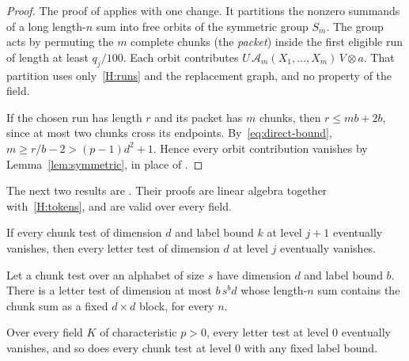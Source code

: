 \begin{proof}
The proof of \cite[Lemma~3.3]{OAI247periodic} applies with one change. It partitions the nonzero summands of a long
length-$n$ sum into free orbits of the symmetric group $S_m$. The group acts by permuting the $m$ complete chunks (the
\emph{packet}) inside the first eligible run of length at least $q_j/100$. Each orbit contributes
$U\,\mathcal A_m(X_1,\dots,X_m)\,V\otimes a$. That partition uses only~\ref{H:runs} and the replacement graph, and no
property of the field.

If the chosen run has length $r$ and its packet has $m$ chunks, then $r\leq mb+2b$, since at most two chunks cross its
endpoints. By~\eqref{eq:direct-bound}, $m\geq r/b-2>(p-1)d^2+1$. Hence every orbit contribution vanishes by
Lemma~\ref{lem:symmetric}, in place of \cite[Lemma~3.2]{OAI247periodic}.
\end{proof}

The next two results are \cite[Lemmas~3.4 and~3.5]{OAI247periodic}. Their proofs are linear algebra together
with~\ref{H:tokens}, and are valid over every field.

\begin{lemma}\label{lem:cut}
If every chunk test of dimension $d$ and label bound $k$ at level $j+1$ eventually vanishes, then every letter test of
dimension $d$ at level $j$ eventually vanishes.
\end{lemma}

\begin{lemma}\label{lem:automaton}
Let a chunk test over an alphabet of size $s$ have dimension $d$ and label bound $b$. There is a letter test of dimension
at most $b\,s^bd$ whose length-$n$ sum contains the chunk sum as a fixed $d\times d$ block, for every $n$.
\end{lemma}

\begin{proposition}\label{prop:all-tests}
Over every field $K$ of characteristic $p>0$, every letter test at level $0$ eventually vanishes, and so does every chunk
test at level $0$ with any fixed label bound.
\end{proposition}

